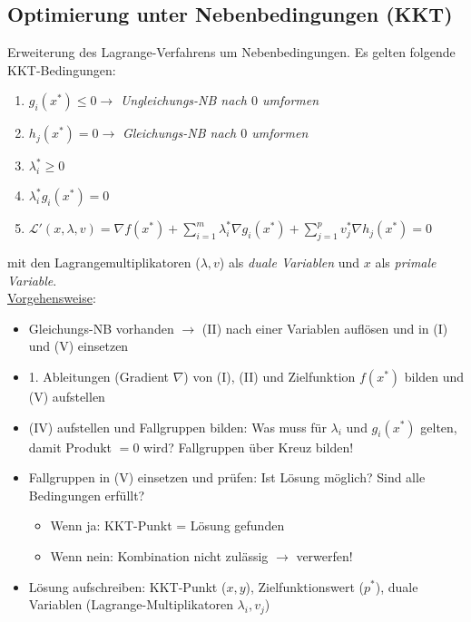 \subsection{Optimierung unter Nebenbedingungen (KKT)}

Erweiterung des Lagrange-Verfahrens um Nebenbedingungen.
Es gelten folgende KKT-Bedingungen:

\begin{enumerate}[label=(\Roman*)]
    \item \(g_i(x^*)\leq 0 \rightarrow \) \emph{Ungleichungs-NB nach \(0\) umformen}
    \item \(h_j(x^*)=0 \rightarrow\) \emph{Gleichungs-NB nach \(0\) umformen}
    \item \(\lambda_i^*\geq 0\)
    \item \(\lambda_i^*g_i(x^*)=0\)
    \item $\mathcal{L}'(x,\lambda, v) = \nabla f(x^*) + \sum_{i=1}^m \lambda_i^* \nabla g_i(x^*) + \sum_{j=1}^p v_j^* \nabla h_j(x^*) = 0$\\
\end{enumerate}

mit den Lagrangemultiplikatoren ($\lambda, v$) als \emph{duale Variablen} und $x$ als \emph{primale Variable}.\\

\underline{Vorgehensweise}:
\begin{itemize}
    \item Gleichungs-NB vorhanden \(\rightarrow\) (II) nach einer Variablen auflösen und in (I) und (V) einsetzen
    \item 1. Ableitungen (Gradient \(\nabla\)) von (I), (II) und Zielfunktion \(f(x^*)\) bilden und (V) aufstellen
    \item (IV) aufstellen und Fallgruppen bilden: Was muss für \(\lambda_i\) und \(g_i(x^*)\) gelten, damit Produkt \(=0\) wird? Fallgruppen über Kreuz bilden!
    \item Fallgruppen in (V) einsetzen und prüfen: Ist Lösung möglich? Sind alle Bedingungen erfüllt?
    \begin{itemize}
        \item Wenn ja: KKT-Punkt = Lösung gefunden
        \item Wenn nein: Kombination nicht zulässig \(\rightarrow\) verwerfen!\\
    \end{itemize}
    \item Lösung aufschreiben: KKT-Punkt (\(x, y\)), Zielfunktionswert (\(p^*\)), duale Variablen (Lagrange-Multiplikatoren \(\lambda_i, v_j\))\\
\end{itemize}


